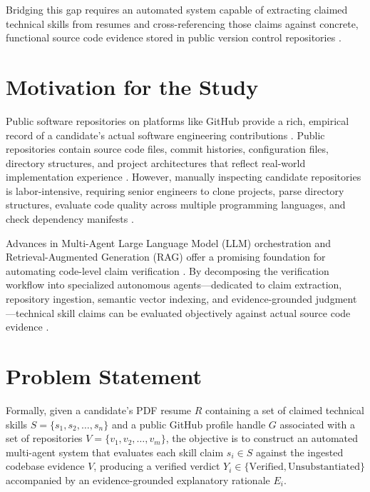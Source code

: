 Bridging this gap requires an automated system capable of extracting claimed technical skills from resumes and cross-referencing those claims against concrete, functional source code evidence stored in public version control repositories \cite{ref12, ref7, ref35}.

\section{Motivation for the Study}

Public software repositories on platforms like GitHub provide a rich, empirical record of a candidate's actual software engineering contributions \cite{ref15, ref16, ref24}. Public repositories contain source code files, commit histories, configuration files, directory structures, and project architectures that reflect real-world implementation experience \cite{ref6, ref25}. However, manually inspecting candidate repositories is labor-intensive, requiring senior engineers to clone projects, parse directory structures, evaluate code quality across multiple programming languages, and check dependency manifests \cite{ref25, ref26, ref36}.

Advances in Multi-Agent Large Language Model (LLM) orchestration and Retrieval-Augmented Generation (RAG) offer a promising foundation for automating code-level claim verification \cite{ref30, ref37, ref38}. By decomposing the verification workflow into specialized autonomous agents—dedicated to claim extraction, repository ingestion, semantic vector indexing, and evidence-grounded judgment—technical skill claims can be evaluated objectively against actual source code evidence \cite{ref10, ref27, ref33, ref39}.

\section{Problem Statement}

Formally, given a candidate's PDF resume $R$ containing a set of claimed technical skills $S = \{s_1, s_2, \dots, s_n\}$ and a public GitHub profile handle $G$ associated with a set of repositories $V = \{v_1, v_2, \dots, v_m\}$, the objective is to construct an automated multi-agent system that evaluates each skill claim $s_i \in S$ against the ingested codebase evidence $V$, producing a verified verdict $Y_i \in \{\text{Verified}, \text{Unsubstantiated}\}$ accompanied by an evidence-grounded explanatory rationale $E_i$.


